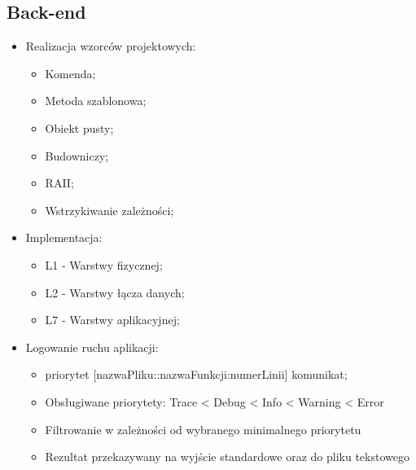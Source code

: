	\subsection{Back-end}
	\begin{itemize}
		\item Realizacja wzorców projektowych:
		\begin{itemize}
			\item Komenda;
			\item Metoda szablonowa;
			\item Obiekt pusty;
			\item Budowniczy;
			\item RAII;
			\item Wstrzykiwanie zależności;
		\end{itemize}
		\item Implementacja:
		\begin{itemize}
			\item L1 - Warstwy fizycznej;
			\item L2 - Warstwy łącza danych;
			\item L7 - Warstwy aplikacyjnej;
		\end{itemize}
		\item Logowanie ruchu aplikacji:
		\begin{itemize}
			\item <h:min::s::ms> priorytet [nazwaPliku::nazwaFunkcji:numerLinii] komunikat;
			\item Obsługiwane priorytety: Trace < Debug < Info <  Warning < Error
			\item Filtrowanie w zależności od wybranego minimalnego priorytetu
			\item Rezultat przekazywany na wyjście standardowe oraz do pliku tekstowego
		\end{itemize}
	\end{itemize}
